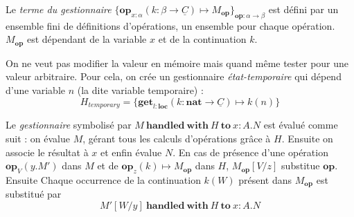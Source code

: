 	Le \textit{terme du gestionnaire} $\{\textbf{op}_{x:\alpha}(k:\beta \rightarrow \underline{C}) \mapsto M_\textbf{op} \}_{\textbf{op}:\alpha \rightarrow \beta}$ est défini par un ensemble fini de définitions d'opérations, un ensemble pour chaque opération. $M_\textbf{op}$ est dépendant de la variable $x$ et de la continuation $k$.
		
			
	
	\begin{exemple}\label{get2}
		On ne veut pas modifier la valeur en mémoire mais quand même tester pour une valeur arbitraire. Pour cela, on crée un gestionnaire \textit{état-temporaire} qui dépend d'une variable $n$ (la dite variable temporaire) :
		\[H_{temporary} = \{\textbf{get}_{l:\textbf{loc}}(k:\textbf{nat} \rightarrow \underline{C}) \mapsto k(n)\}\]
	\end{exemple}
	\bigbreak

	Le \textit{gestionnaire} symbolisé par $M~\textbf{handled}~\textbf{with}~H~\textbf{to}~x:A.N$ est évalué comme suit : on évalue $M$, gérant tous les calculs d'opérations grâce à $H$. Ensuite on associe le résultat à $x$ et enfin évalue $N$.
	En cas de présence d'une opération $\textbf{op}_V(y.M')$ dans $M$ et de $\textbf{op}_z(k) \mapsto M_\textbf{op}$ dans $H$, $M_\textbf{op}[V/z]$ substitue $\textbf{op}$. Ensuite Chaque occurrence de la continuation $k(W)$ présent dans $M_\textbf{op}$ est substitué par  
	\[M'[W/y]~\textbf{handled}~\textbf{with}~H~\textbf{to}~x:A.N\]

